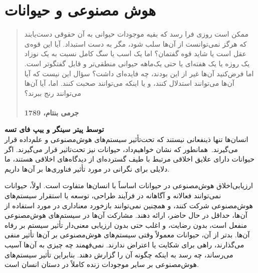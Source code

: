 

\chapter{هوش مصنوعی و حیوانات}
\label{ch:هوش مصنوعی و حیوانات}


\begin{quote}
    ممکن است روزی فرا رسد که بقیه موجودات حیوانی به آن حقوقی دست‌یابند که هرگز نمی‌توانست از آن‌ها سلب شود، مگر به دست استبداد.
    آیا این قوه‌ی عقل است یا شاید قوه گفتمان؟ اما یک اسب یا سگ کامل نسبت به یک نوزاد یک روزه یا یک هفته‌ای یا حتی یک‌ماهه حیوانی منطقی‌تر و قابل گفتگوتر است.
    اما فرض‌کنید آن‌ها غیر از این بودند، چه فایده‌ای داشت؟ سؤال این نیست که آیا آن‌ها می‌توانند استدلال کنند، و یا اینکه می‌توانند صحبت کنند.
    اما، آیا آن‌ها می‌توانند رنج ببرند؟
    \\\\
    \textbf{جرمی بنتام، 1789}
    \newline
    \newline
    \newline
\end{quote}

\textbf{توسط پیتر سینگر و ییپ فای تسه}
\\
انسان‌ها تنها ذینفعانی نیستند که تحت‌تأثیر سیستم‌های هوش‌مصنوعی و علم‌داده قرار می‌گیرند.\ همانطور که نشان خواهیم‌داد، حیوانات نیز تحت‌تاثیر قرار می‌گیرند.
اگر حیوانات دارای علایق اخلاقی مرتبط با طیف گسترده‌ای از دیدگاه‌های اخلاقی هستند، ما دلایلی برای نگرانی در مورد تأثیر فناوری‌ها بر آن‌ها داریم.

ارزیابی‌اخلاق هوش‌مصنوعی در حیوانات اساساً با انسان‌ها متفاوت است.
اولاً، حیوانات نمی‌توانند فعالانه و آگاهانه در فرآیند طراحی، توسعه یا استقرار سیستم‌های هوش‌مصنوعی شرکت کنند، و همچنین نمی‌توانند بازخورد معناداری در مورد استفاده از آن‌ها، حداقل در حال حاضر، ارائه دهند.
مشارکت آن‌ها در سیستم‌های هوش‌مصنوعی منفعل است، بدون رضایت، و اغلب حتی بدون ارزیابی معنی‌دار تأثیر سیستم بر رفاه آن‌ها.
بدتر از آن، حیوانات معمولاً وقتی سیستم‌های هوش‌مصنوعی بر آن‌ها تأثیر منفی می‌گذارند، راهی برای شکایت یا اعتراض ندارند.
نمی‌فهمند چه چیزی به آن‌ها آسیب می‌رساند، چه رسد به اینکه چگونه آن را گزارش دهند.
بنابراین تأثیر سیستم‌های هوش‌مصنوعی بر سایر موجودات زنده کاملاً در دستان انسان است.

